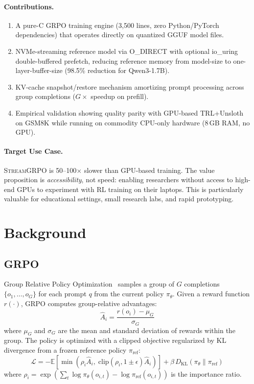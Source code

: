\documentclass[sigconf,review,anonymous]{acmart}
\begin{document}
\paragraph{Contributions.}
\begin{enumerate}
\item A pure-C GRPO training engine (3,500 lines, zero Python/PyTorch dependencies) that operates directly on quantized GGUF model files.
\item NVMe-streaming reference model via O\_DIRECT with optional io\_uring double-buffered prefetch, reducing reference memory from model-size to one-layer-buffer-size (98.5\% reduction for Qwen3-1.7B).
\item KV-cache snapshot/restore mechanism amortizing prompt processing across group completions ($G\times$ speedup on prefill).
\item Empirical validation showing quality parity with GPU-based TRL+Unsloth on GSM8K while running on commodity CPU-only hardware (8\,GB RAM, no GPU).
\end{enumerate}

\paragraph{Target Use Case.} \textsc{StreamGRPO} is 50--100$\times$ slower than GPU-based training. The value proposition is \emph{accessibility}, not speed: enabling researchers without access to high-end GPUs to experiment with RL training on their laptops. This is particularly valuable for educational settings, small research labs, and rapid prototyping.

\section{Background}

\subsection{GRPO}

Group Relative Policy Optimization~\cite{shao2024deepseekmath} samples a group of $G$ completions $\{o_1, \ldots, o_G\}$ for each prompt $q$ from the current policy $\pi_\theta$. Given a reward function $r(\cdot)$, GRPO computes group-relative advantages:
\begin{equation}
\hat{A}_i = \frac{r(o_i) - \mu_G}{\sigma_G}
\end{equation}
where $\mu_G$ and $\sigma_G$ are the mean and standard deviation of rewards within the group. The policy is optimized with a clipped objective regularized by KL divergence from a frozen reference policy $\pi_{\text{ref}}$:
\begin{equation}
\mathcal{L} = -\mathbb{E}\left[\min\left(\rho_i \hat{A}_i,\; \text{clip}(\rho_i, 1\pm\epsilon)\hat{A}_i\right)\right] + \beta\, D_{\text{KL}}(\pi_\theta \| \pi_{\text{ref}})
\end{equation}
where $\rho_i = \exp\left(\sum_t \log \pi_\theta(o_{i,t}) - \log \pi_{\text{ref}}(o_{i,t})\right)$ is the importance ratio.
\end{document}
